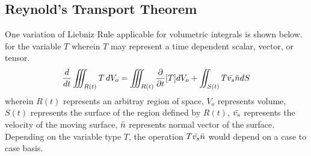 \documentclass[class=report, 12pt, crop=false]{standalone}
\begin{document}
\begin{center}
\chapter{Reynold's Transport Theorem}
\begin{comment}
Liebnitz Theorem

In the middle of additions:


\end{comment}
One variation of Liebniz Rule applicable for volumetric integrals is shown below. for the variable $T$ wherein $T$ may represent a time dependent scalar, vector, or tensor.
$$\frac{d}{dt}\iiint_{R(t)}T\,dV_o = \iiint_{R(t)}\frac{\partial}{\partial t}[T]dV_o + \iint_{S(t)}T\bar{v_s}\bar{n}dS$$
wherein $R(t)$ represents an arbitray region of space, $V_o$ represents volume, $S(t)$ represents the surface of the region defined by $R(t)$, $\bar{v_s}$ represents the velocity of the moving surface, $\bar{n}$ represents normal vector of the surface. Depending on the variable type $T$, the operation $\displaystyle{T\bar{v_s}\bar{n}}$ would depend on a case to case basis.


\end{center}
\end{document}
